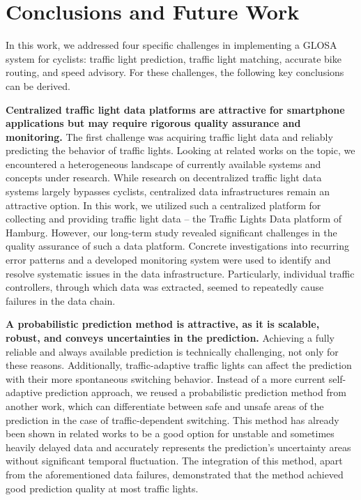 \chapter{Conclusions and Future Work}\label{ch:conclusions}

In this work, we addressed four specific challenges in implementing a GLOSA system for cyclists: traffic light prediction, traffic light matching, accurate bike routing, and speed advisory. For these challenges, the following key conclusions can be derived.

\textbf{\color{cidarkblue}Centralized traffic light data platforms are attractive for smartphone applications but may require rigorous quality assurance and monitoring.} The first challenge was acquiring traffic light data and reliably predicting the behavior of traffic lights. Looking at related works on the topic, we encountered a heterogeneous landscape of currently available systems and concepts under research. While research on decentralized traffic light data systems largely bypasses cyclists, centralized data infrastructures remain an attractive option. In this work, we utilized such a centralized platform for collecting and providing traffic light data -- the Traffic Lights Data platform of Hamburg. However, our long-term study revealed significant challenges in the quality assurance of such a data platform. Concrete investigations into recurring error patterns and a developed monitoring system were used to identify and resolve systematic issues in the data infrastructure. Particularly, individual traffic controllers, through which data was extracted, seemed to repeatedly cause failures in the data chain.

\textbf{\color{cidarkblue}A probabilistic prediction method is attractive, as it is scalable, robust, and conveys uncertainties in the prediction.} Achieving a fully reliable and always available prediction is technically challenging, not only for these reasons. Additionally, traffic-adaptive traffic lights can affect the prediction with their more spontaneous switching behavior. Instead of a more current self-adaptive prediction approach, we reused a probabilistic prediction method from another work, which can differentiate between safe and unsafe areas of the prediction in the case of traffic-dependent switching. This method has already been shown in related works to be a good option for unstable and sometimes heavily delayed data and accurately represents the prediction's uncertainty areas without significant temporal fluctuation. The integration of this method, apart from the aforementioned data failures, demonstrated that the method achieved good prediction quality at most traffic lights.

